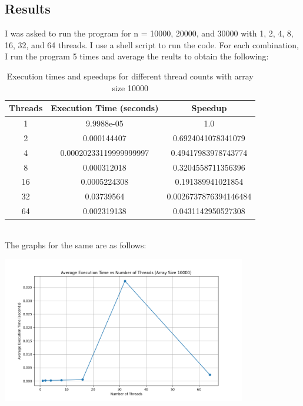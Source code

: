 \documentclass[12pt]{article}
\begin{document}
\subsection*{Results}
I was asked to run the program for n = 10000, 20000, and 30000 with 1, 2, 4, 8, 16, 32, and 64 threads. I use a shell script to run the code. For each combination, I run the program 5 times and average the reults to obtain the following:\\
\begin{table}[h!]
    \centering
    \begin{tabular}{|c|c|c|}
        \hline
        \textbf{Threads} & \textbf{Execution Time (seconds)} & \textbf{Speedup} \\
        \hline
        1 & 9.9988e-05 & 1.0 \\
        \hline
        2 & 0.000144407 & 0.6924041078341079 \\
        \hline
        4 & 0.00020233119999999997 & 0.49417983978743774 \\
        \hline
        8 & 0.000312018 & 0.3204558711356396 \\
        \hline
        16 & 0.0005224308 & 0.191389941021854 \\
        \hline
        32 & 0.03739564 & 0.0026737876394146484 \\
        \hline
        64 & 0.002319138 & 0.0431142950527308 \\
        \hline
    \end{tabular}
    \caption{Execution times and speedups for different thread counts with array size 10000}
    \label{table:results}
\end{table}\\
The graphs for the same are as follows:
\begin{center}
    \includegraphics[width=0.8\textwidth]{execution_time_vs_threads_10000.png}
    \label{fig:10000}
\end{center}
\end{document}
